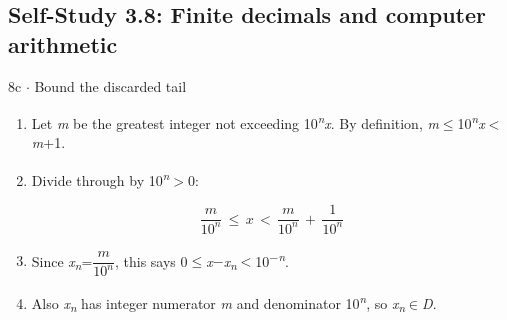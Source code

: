 \documentclass[11pt]{article}
\begin{document}
\begin{keepsection}\subsection{Self-Study 3.8: Finite decimals and computer arithmetic}

\begin{workedbox}{8c \ensuremath{\cdot} Bound the discarded tail}
\begin{enumerate}
\item Let \textit{m} be the greatest integer not exceeding 10\textsuperscript{\textit{n}}\textit{x}. By definition, \textit{m}\ensuremath{\leq}10\textsuperscript{\textit{n}}\textit{x}\ensuremath{<}\textit{m}+1.
\item {}
Divide through by 10\textsuperscript{\textit{n}}\ensuremath{>}0:

\begin{equation*}\dfrac{{m}}{10^{{n}}}\, \leq \, {x}\, <\, \dfrac{{m}}{10^{{n}}}\, +\, \dfrac{1}{10^{{n}}}\end{equation*}
\item Since \textit{x}\textsubscript{\textit{n}}={\small\ensuremath{\dfrac{{m}}{10^{{n}}}}}, this says 0\ensuremath{\leq}\textit{x}\ensuremath{-}\textit{x}\textsubscript{\textit{n}}\ensuremath{<}10\textsuperscript{\ensuremath{-}\textit{n}}.
\item Also \textit{x}\textsubscript{\textit{n}} has integer numerator \textit{m} and denominator 10\textsuperscript{\textit{n}}, so \textit{x}\textsubscript{\textit{n}}\ensuremath{\in}\textit{D}.
\end{enumerate}
\end{workedbox}

\end{keepsection}
\end{document}
